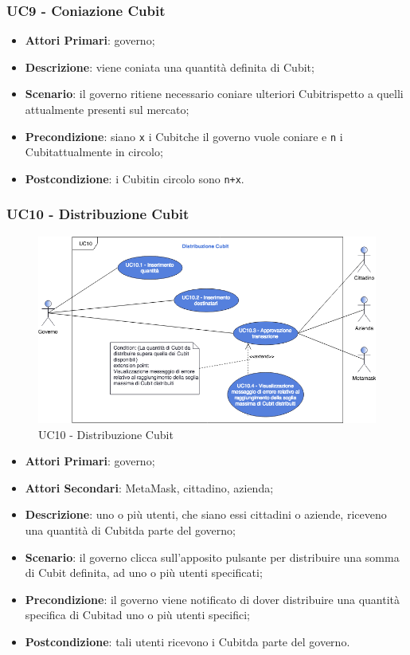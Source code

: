 \subsubsection{UC9 - Coniazione Cubit}
\begin{itemize}
	\item \textbf{Attori Primari}: governo;
	\item \textbf{Descrizione}: viene coniata una quantità definita di Cubit\glo;
	
	\item \textbf{Scenario}: il governo ritiene necessario coniare ulteriori Cubit\glosp rispetto a quelli attualmente presenti sul mercato;
	\item \textbf{Precondizione}: siano \texttt{x} i Cubit\glosp che il governo vuole coniare e \texttt{n} i Cubit\glosp attualmente in circolo;
	\item \textbf{Postcondizione}: i Cubit\glosp in circolo sono \texttt{n+x}.
\end{itemize}
\subsubsection{UC10 - Distribuzione Cubit}
\begin{figure}[h]
	\includegraphics[width=13.5cm]{res/images/UC10Distribuzione.png} %
	\centering
	\caption{UC10 - Distribuzione Cubit}
	
\end{figure}
\begin{itemize}
	\item \textbf{Attori Primari}: governo;
	\item \textbf{Attori Secondari}: MetaMask\glo, cittadino, azienda\glo;
	\item \textbf{Descrizione}: uno o più  utenti, che siano essi cittadini o aziende, riceveno una quantità di Cubit\glosp da parte del governo;
	\item \textbf{Scenario}: il governo clicca sull'apposito pulsante per distribuire una somma di Cubit definita, ad uno o più utenti specificati; 
	\item \textbf{Precondizione}: il governo viene notificato di dover distribuire una quantità specifica di Cubit\glosp ad uno o più utenti specifici;
	\item \textbf{Postcondizione}: tali utenti ricevono i Cubit\glosp da parte del governo.
\end{itemize}
